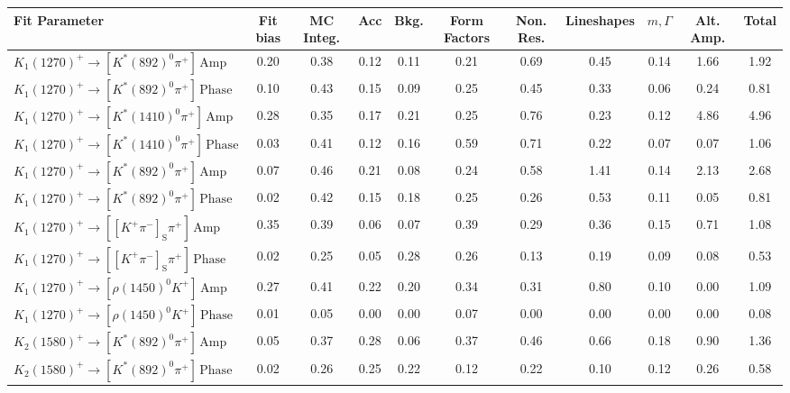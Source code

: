 \begin{tabular}{l  c  c  c  c  c  c  c  c  c  | c }
\hline
\hline
Fit Parameter & Fit bias & MC Integ. & Acc & Bkg. & Form Factors & Non. Res. & Lineshapes & $m,\Gamma$ & Alt. Amp. &  Total  \\ 
\hline
$K_{1}(1270)^{+}\rightarrow \left[K^{*}(892)^{0}\pi^{+}\right]\,\text{Amp}$ & 0.20 & 0.38 & 0.12 & 0.11 & 0.21 & 0.69 & 0.45 & 0.14 & 1.66 & 1.92 \\ 
$K_{1}(1270)^{+}\rightarrow \left[K^{*}(892)^{0}\pi^{+}\right]\,\text{Phase}$ & 0.10 & 0.43 & 0.15 & 0.09 & 0.25 & 0.45 & 0.33 & 0.06 & 0.24 & 0.81 \\ 
$K_{1}(1270)^{+}\rightarrow \left[K^{*}(1410)^{0}\pi^{+}\right]\,\text{Amp}$ & 0.28 & 0.35 & 0.17 & 0.21 & 0.25 & 0.76 & 0.23 & 0.12 & 4.86 & 4.96 \\ 
$K_{1}(1270)^{+}\rightarrow \left[K^{*}(1410)^{0}\pi^{+}\right]\,\text{Phase}$ & 0.03 & 0.41 & 0.12 & 0.16 & 0.59 & 0.71 & 0.22 & 0.07 & 0.07 & 1.06 \\ 
$K_{1}(1270)^{+}\rightarrow \left[K^{*}(892)^{0}\pi^{+}\right]\,\text{Amp}$ & 0.07 & 0.46 & 0.21 & 0.08 & 0.24 & 0.58 & 1.41 & 0.14 & 2.13 & 2.68 \\ 
$K_{1}(1270)^{+}\rightarrow \left[K^{*}(892)^{0}\pi^{+}\right]\,\text{Phase}$ & 0.02 & 0.42 & 0.15 & 0.18 & 0.25 & 0.26 & 0.53 & 0.11 & 0.05 & 0.81 \\ 
$K_{1}(1270)^{+}\rightarrow \left[\left[K^{+}\pi^{-}\right]_{\text{S}}\pi^{+}\right]\,\text{Amp}$ & 0.35 & 0.39 & 0.06 & 0.07 & 0.39 & 0.29 & 0.36 & 0.15 & 0.71 & 1.08 \\ 
$K_{1}(1270)^{+}\rightarrow \left[\left[K^{+}\pi^{-}\right]_{\text{S}}\pi^{+}\right]\,\text{Phase}$ & 0.02 & 0.25 & 0.05 & 0.28 & 0.26 & 0.13 & 0.19 & 0.09 & 0.08 & 0.53 \\ 
$K_{1}(1270)^{+}\rightarrow \left[\rho(1450)^{0}K^{+}\right]\,\text{Amp}$ & 0.27 & 0.41 & 0.22 & 0.20 & 0.34 & 0.31 & 0.80 & 0.10 & 0.00 & 1.09 \\ 
$K_{1}(1270)^{+}\rightarrow \left[\rho(1450)^{0}K^{+}\right]\,\text{Phase}$ & 0.01 & 0.05 & 0.00 & 0.00 & 0.07 & 0.00 & 0.00 & 0.00 & 0.00 & 0.08 \\ 
$K_{2}(1580)^{+}\rightarrow \left[K^{*}(892)^{0}\pi^{+}\right]\,\text{Amp}$ & 0.05 & 0.37 & 0.28 & 0.06 & 0.37 & 0.46 & 0.66 & 0.18 & 0.90 & 1.36 \\ 
$K_{2}(1580)^{+}\rightarrow \left[K^{*}(892)^{0}\pi^{+}\right]\,\text{Phase}$ & 0.02 & 0.26 & 0.25 & 0.22 & 0.12 & 0.22 & 0.10 & 0.12 & 0.26 & 0.58 \\ 

\end{tabular}
